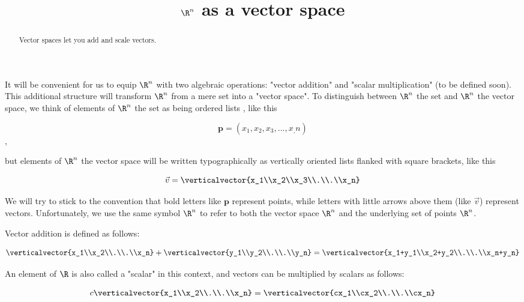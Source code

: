 \documentclass{ximera}
\begin{document}
\title{$\R^n$ as a vector space}
\begin{abstract}
	Vector spaces let you add and scale vectors.
\end{abstract}
It will be convenient for us to equip $\R^n$ with two algebraic operations:  "vector addition" and "scalar multiplication" (to be defined soon).
This additional structure will transform $\R^n$ from a mere set into a "vector space".  To distinguish between $\R^n$ the set and $\R^n$ the vector space,
 we think of elements of $\R^n$ the set as being ordered lists , like this 
 
 \[\mathbf{p} = (x_1,x_2,x_3, ...,x_,n)\],
 
 but elements of $\R^n$ the vector space will be written typographically as vertically oriented lists flanked with square brackets, like this 
 
  \[ \vec{v}= \verticalvector{x_1\\x_2\\x_3\\.\\.\\x_n}\]
 
We will try to stick to the convention that bold letters like $\mathbf{p}$ represent points, while letters with little arrows above them (like $\vec{v}$) represent vectors. 
Unfortunately, we use the same symbol $\R^n$ to refer to both the vector space $\R^n$ and the underlying set of points $\R^n$.
 
 Vector addition is defined as follows:
 
 \[\verticalvector{x_1\\x_2\\.\\.\\x_n} +\verticalvector{y_1\\y_2\\.\\.\\y_n}=\verticalvector{x_1+y_1\\x_2+y_2\\.\\.\\x_n+y_n}\]
	 	
	An element of $\R$ is also called a "scalar" in this context, and vectors can be multiplied by scalars as follows:
	
	\[ c\verticalvector{x_1\\x_2\\.\\.\\x_n} = \verticalvector{cx_1\\cx_2\\.\\.\\cx_n} \]
 	 
\end{document}
